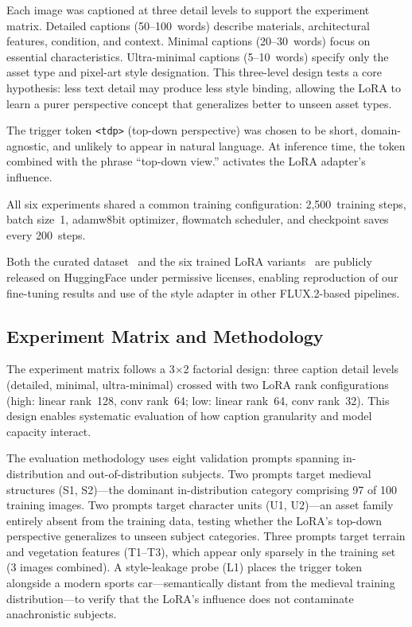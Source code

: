 \documentclass[conference]{IEEEtran}
\begin{document}
Each image was captioned at three detail levels to support the experiment
matrix. Detailed captions (50--100~words) describe materials, architectural
features, condition, and context. Minimal captions (20--30~words) focus on
essential characteristics. Ultra-minimal captions (5--10~words) specify
only the asset type and pixel-art style designation. This three-level
design tests a core hypothesis: less text detail may produce less style
binding, allowing the LoRA to learn a purer perspective concept that
generalizes better to unseen asset types.

The trigger token \texttt{<tdp>} (top-down perspective) was chosen to be
short, domain-agnostic, and unlikely to appear in natural language. At
inference time, the token combined with the phrase ``top-down view.''
activates the LoRA adapter's influence.

All six experiments shared a common training configuration: 2,500~training
steps, batch size~1, adamw8bit optimizer, flowmatch scheduler, and
checkpoint saves every 200~steps.

Both the curated dataset~\cite{asakskogen2026topdown} and the six trained
LoRA variants~\cite{asakskogen2026strategai} are publicly released on
HuggingFace under permissive licenses, enabling reproduction of our
fine-tuning results and use of the style adapter in other FLUX.2-based
pipelines.

\subsection{Experiment Matrix and Methodology}

The experiment matrix follows a 3$\times$2 factorial design: three caption
detail levels (detailed, minimal, ultra-minimal) crossed with two LoRA rank
configurations (high: linear rank~128, conv rank~64; low: linear rank~64,
conv rank~32). This design enables systematic evaluation of how caption
granularity and model capacity interact.

The evaluation methodology uses eight validation prompts spanning
in-distribution and out-of-distribution subjects. Two prompts target
medieval structures (S1, S2)---the dominant in-distribution category
comprising 97 of 100 training images. Two prompts target character units
(U1, U2)---an asset family entirely absent from the training data, testing
whether the LoRA's top-down perspective generalizes to unseen subject
categories. Three prompts target terrain and vegetation features (T1--T3),
which appear only sparsely in the training set (3 images combined). A
style-leakage probe (L1) places the trigger token alongside a modern sports
car---semantically distant from the medieval training distribution---to
verify that the LoRA's influence does not contaminate anachronistic
subjects.
\end{document}
